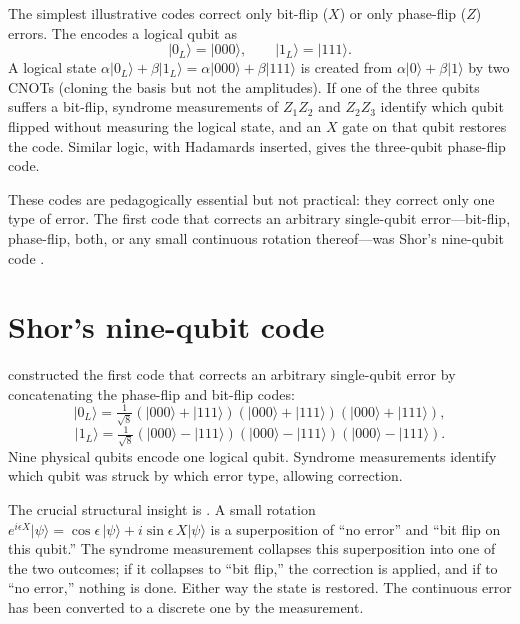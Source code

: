 The simplest illustrative codes correct only bit-flip ($X$) or only phase-flip ($Z$) errors. The  encodes a logical qubit as
\[
  |0_L\rangle = |000\rangle, \qquad |1_L\rangle = |111\rangle.
\]
A logical state $\alpha|0_L\rangle + \beta|1_L\rangle = \alpha|000\rangle + \beta|111\rangle$ is created from $\alpha|0\rangle + \beta|1\rangle$ by two CNOTs (cloning the basis but not the amplitudes). If one of the three qubits suffers a bit-flip, syndrome measurements of $Z_1 Z_2$ and $Z_2 Z_3$ identify which qubit flipped without measuring the logical state, and an $X$ gate on that qubit restores the code. Similar logic, with Hadamards inserted, gives the three-qubit phase-flip code.

These codes are pedagogically essential but not practical: they correct only one type of error. The first code that corrects an arbitrary single-qubit error---bit-flip, phase-flip, both, or any small continuous rotation thereof---was Shor's nine-qubit code \citep{shor_scheme_1995}.

\section{Shor's nine-qubit code}

\citet{shor_scheme_1995} constructed the first code that corrects an arbitrary single-qubit error by concatenating the phase-flip and bit-flip codes:
\[
  |0_L\rangle = \tfrac{1}{\sqrt 8}(|000\rangle+|111\rangle)(|000\rangle+|111\rangle)(|000\rangle+|111\rangle),
\]
\[
  |1_L\rangle = \tfrac{1}{\sqrt 8}(|000\rangle-|111\rangle)(|000\rangle-|111\rangle)(|000\rangle-|111\rangle).
\]
Nine physical qubits encode one logical qubit. Syndrome measurements identify which qubit was struck by which error type, allowing correction.

The crucial structural insight is . A small rotation $e^{i\epsilon X}|\psi\rangle = \cos\epsilon\,|\psi\rangle + i\sin\epsilon\,X|\psi\rangle$ is a superposition of ``no error'' and ``bit flip on this qubit.'' The syndrome measurement collapses this superposition into one of the two outcomes; if it collapses to ``bit flip,'' the correction is applied, and if to ``no error,'' nothing is done. Either way the state is restored. The continuous error has been converted to a discrete one by the measurement.

